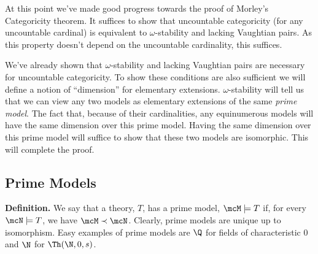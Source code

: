 At this point we've made good progress towards the proof of Morley's Categoricity theorem.
It suffices to show that uncountable categoricity (for any uncountable cardinal) is equivalent to \(\omega\)-stability and lacking Vaughtian pairs.
As this property doesn't depend on the uncountable cardinality, this suffices. 

We've already shown that \(\omega\)-stability and lacking Vaughtian pairs are necessary for uncountable categoricity.
To show these conditions are also sufficient we will define a notion of ``dimension'' for elementary extensions.
\(\omega\)-stability will tell us that we can view any two models as elementary extensions of the same \textit{prime model}.
The fact that, because of their cardinalities, any equinumerous models will have the same dimension over this prime model.
Having the same dimension over this prime model will suffice to show that these two models are isomorphic.
This will complete the proof. 

\subsection{Prime Models}

\textbf{Definition.} We say that a theory, \(T\),  has a prime model, \(\mcM \models T\) if, for every \(\mcN \models T\), we have \(\mcM \prec \mcN\). 
Clearly, prime models are unique up to isomorphism. Easy examples of prime models are \(\Q\) for fields of characteristic 0 and \(\N\) for \(\Th(\N, 0, s)\). 







